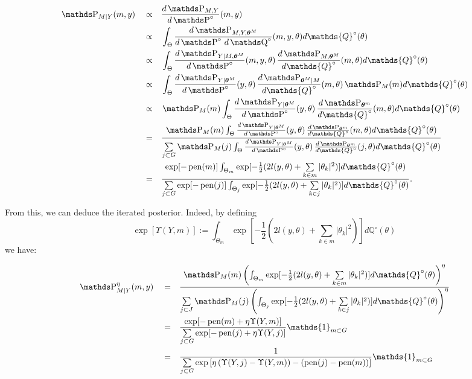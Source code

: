 \begin{alignat*}{3}
&\P_{M \vert Y}(m, y) &&\propto&& \frac{d\P_{M, Y}}{d\P^{\circ}}(m, y)\\
& &&\propto&&\int_{\Theta}\frac{d\P_{M, Y, \boldsymbol{\theta}^{M}}}{d\P^{\circ} \, d\Q^{\circ}}(m, y, \theta)d\mathds{Q}^{\circ}(\theta)\\
& &&\propto&&\int_{\Theta}\frac{d\P_{Y \vert M, \boldsymbol{\theta}^{M}}}{d\P^{\circ}}(m, y, \theta) \, \frac{d\P_{M, \boldsymbol{\theta}^{M}}}{d\mathds{Q}^{\circ}}(m, \theta)d\mathds{Q}^{\circ}(\theta)\\
& &&\propto&&\int_{\Theta}\frac{d\P_{Y \vert \boldsymbol{\theta}^{M}}}{d\P^{\circ}}(y, \theta) \, \frac{d\P_{\boldsymbol{\theta}^{M}\vert M}}{d\mathds{Q}^{\circ}}(m, \theta) \P_{M}(m)d\mathds{Q}^{\circ}(\theta)\\
& &&\propto&&\P_{M}(m)\int_{\Theta}\frac{d\P_{Y \vert \boldsymbol{\theta}^{M}}}{d\P^{\circ}}(y, \theta) \, \frac{d\P_{\boldsymbol{\theta}^{m}}}{d\mathds{Q}^{\circ}}(m, \theta) d\mathds{Q}^{\circ}(\theta)\\
& && = && \frac{\P_{M}(m)\int_{\Theta}\frac{d\P_{Y \vert \boldsymbol{\theta}^{M}}}{d\P^{\circ}}(y, \theta) \, \frac{d\P_{\boldsymbol{\theta}^{m}}}{d\mathds{Q}^{\circ}}(m, \theta) d\mathds{Q}^{\circ}(\theta)}{\sum\limits_{j \subset G}\P_{M}(j)\int_{\Theta}\frac{d\P_{Y \vert \boldsymbol{\theta}^{M}}}{d\P^{\circ}}(y, \theta) \, \frac{d\P_{\boldsymbol{\theta}^{m}}}{d\mathds{Q}^{\circ}}(j, \theta) d\mathds{Q}^{\circ}(\theta)}\\
& && = && \frac{\exp[- \pen(m)] \int_{\Theta_{m}}\exp[-\frac{1}{2}(2 l(y, \theta) + \sum\limits_{k \in m} \vert \theta_{k} \vert^{2})] d\mathds{Q}^{\circ}(\theta)}{\sum\limits_{j \subset G}\exp[- \pen(j)] \int_{\Theta_{j}}\exp[-\frac{1}{2}(2 l(y, \theta) + \sum\limits_{k \in j} \vert \theta_{k} \vert^{2})] d\mathds{Q}^{\circ}(\theta)}.
\end{alignat*}

From this, we can deduce the iterated posterior.
Indeed, by defining
\[\exp[\Upsilon(Y, m)] := \int_{\Theta_{m}}\exp[-\frac{1}{2}(2 l(y, \theta) + \sum\limits_{k \in m} \vert \theta_{k} \vert^{2})] d\mathds{Q}^{\circ}(\theta)\]
we have:

\begin{alignat*}{3}
&\P_{M \vert Y}^{\eta}(m, y) && = && \frac{\P_{M}(m)\left(\int_{\Theta_{m}}\exp[-\frac{1}{2}(2 l(y, \theta) + \sum\limits_{k \in m} \vert \theta_{k} \vert^{2})] d\mathds{Q}^{\circ}(\theta)\right)^{\eta}}{\sum\limits_{j \subset J}\P_{M}(j)\left(\int_{\Theta_{j}}\exp[-\frac{1}{2}(2 l(y, \theta) + \sum\limits_{k \in j} \vert \theta_{k} \vert^{2})] d\mathds{Q}^{\circ}(\theta)\right)^{\eta}}\\
& && = && \frac{\exp[-\pen(m) + \eta \Upsilon(Y, m)]}{\sum\limits_{j \subset G}\exp[- \pen(j) + \eta \Upsilon(Y, j)]} \mathds{1}_{m \subset G}\\
& && = && \frac{1}{\sum\limits_{j \subset G}\exp\left[\eta \left(\Upsilon(Y, j) - \Upsilon(Y, m)\right) - \left(\pen(j) - \pen(m)\right)\right]} \mathds{1}_{m \subset G}
\end{alignat*}


